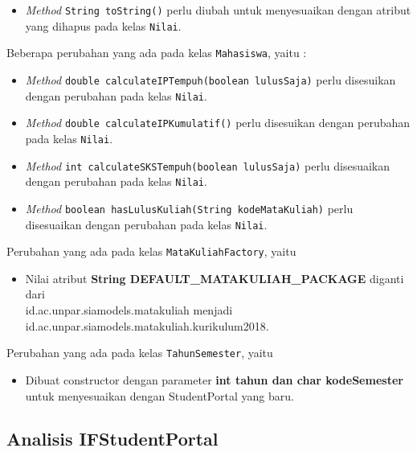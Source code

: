 \begin{enumerate}
\begin{itemize}
		\item \textit{Method} \texttt{String toString()} perlu diubah untuk menyesuaikan dengan atribut yang dihapus pada kelas \texttt{Nilai}.
	\end{itemize}
	Beberapa perubahan yang ada pada kelas \texttt{Mahasiswa}, yaitu :
	\begin{itemize}
		\item \textit{Method} \texttt{double calculateIPTempuh(boolean lulusSaja)} perlu disesuikan dengan perubahan pada kelas \texttt{Nilai}.
		\item \textit{Method} \texttt{double calculateIPKumulatif()} perlu disesuikan dengan perubahan pada kelas \texttt{Nilai}.
		\item \textit{Method} \texttt{int calculateSKSTempuh(boolean lulusSaja)} perlu disesuaikan dengan perubahan pada kelas \texttt{Nilai}.
		\item \textit{Method} \texttt{boolean hasLulusKuliah(String kodeMataKuliah)} perlu disesuaikan dengan perubahan pada kelas \texttt{Nilai}.
	\end{itemize}
	Perubahan yang ada pada kelas \texttt{MataKuliahFactory}, yaitu 
	\begin{itemize}
		\item Nilai atribut \textbf{String DEFAULT\_MATAKULIAH\_PACKAGE} diganti dari\\ id.ac.unpar.siamodels.matakuliah menjadi id.ac.unpar.siamodels.matakuliah.kurikulum2018.
	\end{itemize}
	Perubahan yang ada pada kelas \texttt{TahunSemester}, yaitu
	\begin{itemize}
		\item Dibuat constructor dengan parameter \textbf{int tahun dan char kodeSemester} untuk menyesuaikan dengan StudentPortal yang baru.
	\end{itemize}
\end{enumerate}

\subsection{Analisis IFStudentPortal}
\label{subbab:analisisifstudentportal}

